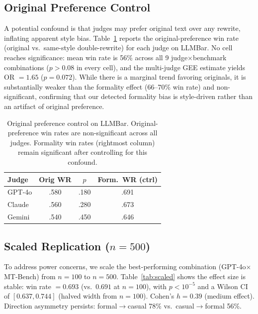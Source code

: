\documentclass[11pt]{article}
\begin{document}
\subsection{Original Preference Control}
\label{sec:orig_pref}

A potential confound is that judges may prefer original text over any rewrite, inflating apparent style bias.
Table~\ref{tab:origpref} reports the original-preference win rate (original vs.\ same-style double-rewrite) for each judge on LLMBar.
No cell reaches significance: mean win rate is 56\% across all 9 judge$\times$benchmark combinations ($p > 0.08$ in every cell), and the multi-judge GEE estimate yields OR $= 1.65$ ($p = 0.072$).
While there is a marginal trend favoring originals, it is substantially weaker than the formality effect (66--70\% win rate) and non-significant, confirming that our detected formality bias is style-driven rather than an artifact of original preference.

\begin{table}[t]
\centering
\small
\begin{tabular}{lccc}
\toprule
\textbf{Judge} & \textbf{Orig WR} & \textbf{$p$} & \textbf{Form.\ WR (ctrl)} \\
\midrule
GPT-4o & .580 & .180 & .691 \\
Claude & .560 & .280 & .673 \\
Gemini & .540 & .450 & .646 \\
\bottomrule
\end{tabular}
\caption{Original preference control on LLMBar. Original-preference win rates are non-significant across all judges. Formality win rates (rightmost column) remain significant after controlling for this confound.}
\label{tab:origpref}
\end{table}

\subsection{Scaled Replication ($n = 500$)}
\label{sec:scaled}

To address power concerns, we scale the best-performing combination (GPT-4o$\times$MT-Bench) from $n = 100$ to $n = 500$.
Table~\ref{tab:scaled} shows the effect size is stable: win rate $= 0.693$ (vs.\ $0.691$ at $n = 100$), with $p < 10^{-5}$ and a Wilson CI of $[0.637, 0.744]$ (halved width from $n = 100$).
Cohen's $h = 0.39$ (medium effect).
Direction asymmetry persists: formal$\to$casual 78\% vs.\ casual$\to$formal 56\%.
\end{document}
